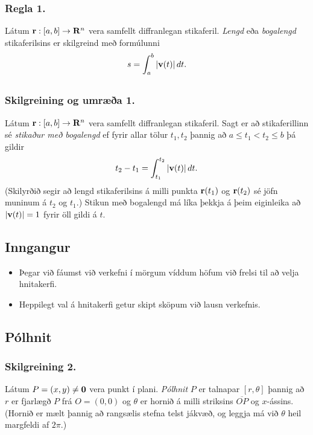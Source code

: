 \subsubsection{Regla 1.}
Látum $\mbox{${\bf r}$}:  [a,b]\rightarrow \mbox{${\bf R}^n$}$ vera samfellt diffranlegan stikaferil.  {\em Lengd} eða 
{\em bogalengd} stikaferilsins er skilgreind með formúlunni 
$$s=\int_a^b |\mbox{${\bf v}$}(t)|\,dt.$$



\subsection{}

\subsubsection{Skilgreining og umræða 1.}
Látum $\mbox{${\bf r}$}: [a,b]\rightarrow \mbox{${\bf R}^n$}$ vera samfellt diffranlegan stikaferil.   Sagt er að
stikaferillinn sé {\em stikaður með  bogalengd} ef fyrir allar tölur $t_1,
t_2$ þannig að $a\leq t_1<t_2\leq b$ þá gildir 
$$t_2-t_1= \int_{t_1}^{t_2} |\mbox{${\bf v}$}(t)|\,dt.$$
(Skilyrðið segir að lengd stikaferilsins á milli punkta $\mbox{${\bf r}$}(t_1)$ og
$\mbox{${\bf r}$}(t_2)$ sé jöfn muninum á $t_2$ og $t_1$.)
Stikun með bogalengd má líka þekkja á þeim eiginleika að $|\mbox{${\bf v}$}(t)|=1$ fyrir öll gildi á $t$.






\subsection{Inngangur}
 \begin {itemize}
  \item Þegar við fáumst við verkefni í mörgum víddum höfum við frelsi til að velja hnitakerfi.
  \item Heppilegt val á hnitakerfi getur skipt sköpum við lausn verkefnis.
 \end {itemize}




\subsection{Pólhnit} 

\subsubsection{Skilgreining 2.}
Látum $P=(x,y)\neq \mbox{${\bf 0}$}$ vera punkt í plani.  {\em Pólhnit} $P$ er talnapar $[r,\theta]$ þannig að $r$ er fjarlægð $P$ frá 
$O=(0,0)$ og $\theta$ er hornið á milli striksins $\overline{OP}$ og $x$-ássins.  (Hornið er mælt þannig að rangsælis stefna telst jákvæð,  og leggja má við $\theta$ heil margfeldi af $2\pi$.)




